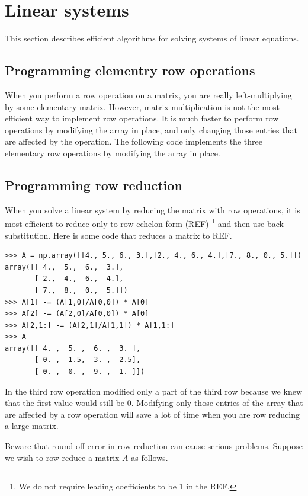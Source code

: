 \section*{Linear systems}
This section describes efficient algorithms for solving systems of linear equations.

\subsection*{Programming elementry row operations}
When you perform a row operation on a matrix, you are really left-multiplying by some elementary matrix. 
However, matrix multiplication is not the most efficient way to implement row operations. It is much faster to perform row operations by modifying the array in place, and only changing those entries that are affected by the operation. 
The following code implements the three elementary row operations by modifying the array in place.



\subsection*{Programming row reduction}
When you solve a linear system by reducing the matrix with row operations, it is most efficient to reduce only to row echelon form (REF)
\footnote{We do not require leading coefficients to be 1 in the REF.} 
and then use back substitution. 
Here is some code that reduces a matrix to REF.

\begin{lstlisting}
>>> A = np.array([[4., 5., 6., 3.],[2., 4., 6., 4.],[7., 8., 0., 5.]])
array([[ 4.,  5.,  6.,  3.],
       [ 2.,  4.,  6.,  4.],
       [ 7.,  8.,  0.,  5.]])
>>> A[1] -= (A[1,0]/A[0,0]) * A[0]
>>> A[2] -= (A[2,0]/A[0,0]) * A[0]
>>> A[2,1:] -= (A[2,1]/A[1,1]) * A[1,1:]
>>> A
array([[ 4. ,  5. ,  6. ,  3. ],
       [ 0. ,  1.5,  3. ,  2.5],
       [ 0. ,  0. , -9. ,  1. ]])
\end{lstlisting}

In the third row operation modified only a part of the third row because we knew that the first value would still be 0. 
Modifying only those entries of the array that are affected by a row operation will save a lot of time when you are row reducing a large matrix.

Beware that round-off error in row reduction can cause serious problems.
Suppose we wish to row reduce a matrix $A$ as follows.

